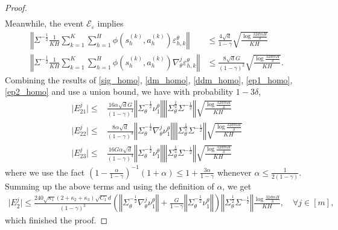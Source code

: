 \documentclass{article}
\numberwithin{equation}{section}
\begin{document}
\begin{proof}
\begin{align}
\end{align}
Meanwhile, the event $\mathcal{E}_\varepsilon$ implies
\begin{align}
    \label{ep1_homo}
    \left\Vert\Sigma^{-\frac{1}{2}}\frac{1}{KH}\sum_{k=1}^K\sum_{h=1}^H\phi\left(s_h^{(k)},a_h^{(k)}\right)\varepsilon_{h,k}^\theta\right\Vert&\leq \frac{4\sqrt{d}}{1-\gamma}\sqrt{\frac{\log\frac{32dmH}{\delta}}{KH}}\\
    \label{ep2_homo}
    \left\Vert\Sigma^{-\frac{1}{2}}\frac{1}{KH}\sum_{k=1}^K\sum_{h=1}^H\phi\left(s_h^{(k)},a_h^{(k)}\right)\nabla_\theta^j\varepsilon_{h,k}^\theta\right\Vert&\leq \frac{8\sqrt{d}G}{(1-\gamma)^2}\sqrt{\frac{\log\frac{32dmH}{\delta}}{KH}}.
\end{align}
Combining the results of \eqref{sig_homo}, \eqref{dm_homo}, \eqref{ddm_homo}, \eqref{ep1_homo}, \eqref{ep2_homo} and use a union bound, we have with probability $1-3\delta$, 
\begin{align*}
    \vert E_{21}^j\vert\leq&\frac{16\alpha\sqrt{d}G}{(1-\gamma)^4}\left\Vert\Sigma_\theta^{-\frac{1}{2}}\nu^\theta_1\right\Vert\left\Vert\Sigma_\theta^{\frac{1}{2}}\Sigma^{-\frac{1}{2}}\right\Vert \sqrt{\frac{\log\frac{32dmH}{\delta}}{KH}}\\
    \vert E_{22}^j\vert\leq&\frac{8\alpha\sqrt{d}}{(1-\gamma)^3}\left\Vert\Sigma_\theta^{-\frac{1}{2}}\nabla_\theta^j\nu^\theta_1\right\Vert\left\Vert\Sigma_\theta^{\frac{1}{2}}\Sigma^{-\frac{1}{2}}\right\Vert\sqrt{\frac{\log\frac{32dmH}{\delta}}{KH}}\\
    \vert E_{23}^j\vert\leq&\frac{16G\alpha\sqrt{d}}{(1-\gamma)^4}\left\Vert\Sigma_\theta^{-\frac{1}{2}}\nu^\theta_1\right\Vert\left\Vert\Sigma_\theta^{\frac{1}{2}}\Sigma^{-\frac{1}{2}}\right\Vert\sqrt{\frac{\log\frac{32dmH}{\delta}}{KH}}
\end{align*}
where we use the fact $(1-\frac{\alpha}{1-\gamma})^{-1}(1+\alpha)\leq 1+\frac{3\alpha}{1-\gamma}$ whenever $\alpha \leq \frac{1}{2(1-\gamma)}$. Summing up the above terms and using the definition of $\alpha$, we get
\begin{align*}
    \vert E_2^j\vert\leq \frac{240\sqrt{\kappa_1}(2+\kappa_2+\kappa_3)\sqrt{C_1}d}{(1-\gamma)^3}\left(\left\Vert\Sigma_\theta^{-\frac{1}{2}}\nabla_\theta^j\nu^\theta_1\right\Vert+\frac{G}{1-\gamma}\left\Vert\Sigma_\theta^{-\frac{1}{2}}\nu^\theta_1\right\Vert\right)\left\Vert\Sigma_\theta^{\frac{1}{2}}\Sigma^{-\frac{1}{2}}\right\Vert\frac{\log\frac{32dmH}{\delta}}{KH},\quad\forall j\in[m],
\end{align*}
which finished the proof. 
\end{proof}
\end{document}

